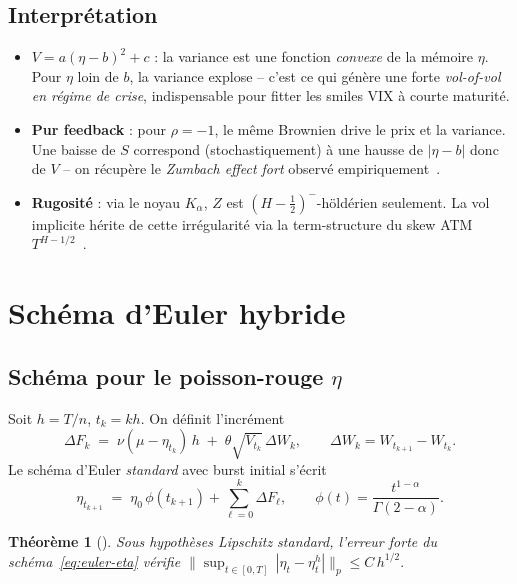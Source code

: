 \documentclass[11pt,a4paper]{article}
\newtheorem{theorem}{Théorème}[section]
\theoremstyle{definition}
\newcommand{\1}{\mathbf{1}}
\begin{document}
\subsection{Interprétation}
\begin{itemize}[leftmargin=*,topsep=1pt,itemsep=1pt]
\item \textbf{$V=a(\eta-b)^2+c$} : la variance est une fonction \emph{convexe} de la
      mémoire $\eta$. Pour $\eta$ loin de $b$, la variance explose -- c'est ce qui
      génère une forte \emph{vol-of-vol en régime de crise}, indispensable pour
      fitter les smiles VIX à courte maturité.
\item \textbf{Pur feedback} : pour $\rho=-1$, le même Brownien drive le prix et la
      variance. Une baisse de $S$ correspond (stochastiquement) à une hausse de
      $|\eta-b|$ donc de $V$ -- on récupère le \emph{Zumbach effect fort}
      observé empiriquement~\cite{Zumbach09}.
\item \textbf{Rugosité} : via le noyau $K_\alpha$, $Z$ est
      $(H-\tfrac{1}{2})^-$-höldérien seulement.
      La vol implicite hérite de cette irrégularité via la term-structure du
      skew ATM $T^{H-1/2}$~\cite{BFG16}.
\end{itemize}

\section{Schéma d'Euler hybride}
\label{sec:scheme}

\subsection{Schéma pour le poisson-rouge $\eta$}
Soit $h=T/n$, $t_k=kh$. On définit l'incrément
\begin{equation}
\Delta F_k \;=\; \nu(\mu-\eta_{t_k})\, h \;+\; \theta\sqrt{V_{t_k}}\, \Delta W_k,
\qquad \Delta W_k = W_{t_{k+1}} - W_{t_k}.
\label{eq:DeltaF}
\end{equation}
Le schéma d'Euler \emph{standard} avec burst initial s'écrit
\begin{equation}
\eta_{t_{k+1}} \;=\; \eta_0\, \phi(t_{k+1}) + \sum_{\ell=0}^{k}\Delta F_\ell,
\qquad \phi(t)=\frac{t^{1-\alpha}}{\Gamma(2-\alpha)}.
\label{eq:euler-eta}
\end{equation}

\begin{theorem}[{\cite[Thm~4.1]{BCGP23}}]
Sous hypothèses Lipschitz standard, l'erreur forte du schéma~\eqref{eq:euler-eta}
vérifie
$\bigl\|\sup_{t\in[0,T]}\,|\eta_t-\eta^h_t|\bigr\|_p \leq C\, h^{1/2}.$
\end{theorem}
\end{document}
